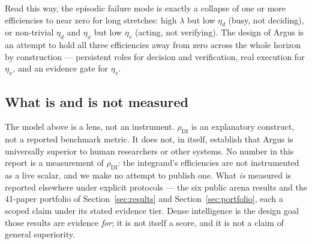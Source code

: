 Read this way, the episodic failure mode is exactly a collapse of one or more
efficiencies to near zero for long stretches: high $\lambda$ but low $\eta_d$
(busy, not deciding), or non-trivial $\eta_d$ and $\eta_x$ but low $\eta_v$
(acting, not verifying). The design of Argus is an attempt to hold all three
efficiencies away from zero across the whole horizon by construction --- persistent
roles for decision and verification, real execution for $\eta_x$, and an evidence
gate for $\eta_v$.

\subsection{What is and is not measured}

The model above is a lens, not an instrument. $\rho_{\mathrm{DI}}$ is an
explanatory construct, not a reported benchmark metric. It does not, in itself,
establish that Argus is universally superior to human researchers or other
systems. No number in this report is a measurement of $\rho_{\mathrm{DI}}$: the
integrand's efficiencies are not instrumented as a live scalar, and we make no
attempt to publish one. What \emph{is} measured is reported elsewhere under
explicit protocols --- the six public arena results and the 41-paper portfolio of
Section~\ref{sec:results} and Section~\ref{sec:portfolio}, each a scoped claim
under its stated evidence tier. Dense intelligence is the design goal those
results are evidence \emph{for}; it is not itself a score, and it is not a claim of
general superiority.
